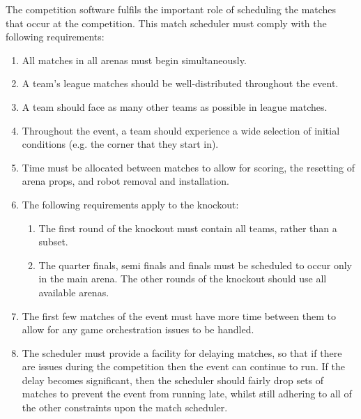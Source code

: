 The competition software fulfils the important role of scheduling the matches that occur at the competition.  This match scheduler must comply with the following requirements:
\begin{enumerate}
\item All matches in all arenas must begin simultaneously.
\item A team's league matches should be well-distributed throughout the event.
\item A team should face as many other teams as possible in league matches.
\item Throughout the event, a team should experience a wide selection of initial conditions (e.g. the corner that they start in).
\item Time must be allocated between matches to allow for scoring, the resetting of arena props, and robot removal and installation.
\item The following requirements apply to the knockout:
  \begin{enumerate}
  \item The first round of the knockout must contain all teams, rather than a subset.
  \item The quarter finals, semi finals and finals must be scheduled to occur only in the main arena.  The other rounds of the knockout should use all available arenas.
  \end{enumerate}

\item The first few matches of the event must have more time between them to allow for any game orchestration issues to be handled.
\item The scheduler must provide a facility for delaying matches, so that if there are issues during the competition then the event can continue to run.  If the delay becomes significant, then the scheduler should fairly drop sets of matches to prevent the event from running late, whilst still adhering to all of the other constraints upon the match scheduler.
\end{enumerate}
